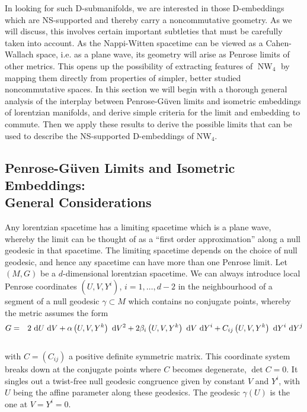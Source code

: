 \documentclass[11pt,a4paper]{article}
\DeclareMathOperator{\NW}{NW}
\def\dd{{\rm d}}
\def\nn{\nonumber}
\def\bea{\begin{eqnarray}}
\newcommand{\eeq}{\end{eqnarray}}
\begin{document}
In looking for such D-submanifolds, we are interested in those
D-embeddings which are NS-supported and thereby carry a noncommutative
geometry. As we will discuss, this involves certain
important subtleties that must be carefully taken into account. As the
Nappi-Witten spacetime can be viewed as a Cahen-Wallach space, i.e. as
a plane wave, its geometry will arise as Penrose limits of other
metrics. This opens up the possibility of extracting features of
$\NW_4$ by mapping them directly from properties of simpler, better
studied noncommutative spaces. In
this section we will begin with a thorough general analysis of the interplay
between Penrose-G\"uven limits and isometric embeddings of lorentzian
manifolds, and derive simple criteria for the limit and embedding to
commute. Then we apply these results to derive the possible limits
that can be used to describe the NS-supported D-embeddings of NW$_4$.

\subsection{Penrose-G\"uven Limits and Isometric Embeddings: \\ General
  Considerations \label{PGLIE}}

Any lorentzian spacetime has a limiting spacetime which is a plane
wave, whereby the limit can be thought of as a ``first order
approximation'' along a null geodesic in that spacetime. The limiting
spacetime depends on the choice of null geodesic, and hence any
spacetime can have more than one Penrose limit. Let $(M,G)$
be a $d$-dimensional lorentzian spacetime. We can always introduce
local Penrose coordinates $(U,V,Y^i)$, $i=1,\dots,d-2$ in the
neighbourhood of a segment of a null geodesic $\gamma\subset M$ which
contains no conjugate points, whereby the metric assumes the form
\bea
G&=&2~\dd U~\dd V+\alpha\left(U,V,Y^k\right)~\dd V^2+2\beta_i
\left(U,V,Y^k\right)~\dd V~\dd Y^i+C_{ij}\left(U,V,
Y^k\right)~\dd Y^i~\dd Y^j \nn\\&&
\label{GPenrose}\eeq
with $C=(C_{ij})$ a positive definite symmetric matrix. This
coordinate system breaks down at the conjugate points where $C$
becomes degenerate, $\det C=0$. It singles out a twist-free null
geodesic congruence given by constant $V$ and $Y^i$, with $U$ being
the affine parameter along these geodesics. The geodesic $\gamma(U)$
is the one at $V=Y^i=0$.
\end{document}
